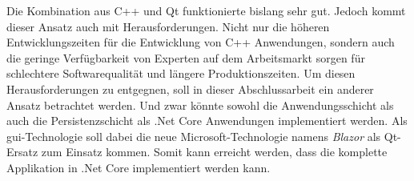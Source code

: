 \newline
\newline
Die Kombination aus C++ und Qt funktionierte bislang sehr gut. Jedoch kommt dieser Ansatz
auch mit Herausforderungen. Nicht nur die höheren Entwicklungszeiten für die
Entwicklung von C++ Anwendungen, sondern auch die geringe Verfügbarkeit von Experten auf dem
Arbeitsmarkt sorgen für schlechtere Softwarequalität und längere Produktionszeiten.
\newline
\newline
Um diesen Herausforderungen zu entgegnen, soll in dieser Abschlussarbeit ein anderer Ansatz
betrachtet
werden. Und zwar könnte sowohl die Anwendungsschicht als auch die Persistenzschicht als .Net
Core Anwendungen implementiert werden. Als \ac{gui}-Technologie soll dabei die neue
Microsoft-Technologie namens \emph{Blazor} als Qt-Ersatz zum Einsatz kommen. Somit kann erreicht
werden, dass die komplette Applikation in .Net Core implementiert werden kann.



